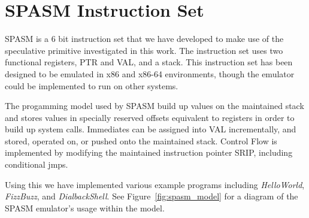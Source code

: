\pagebreak
\section{SPASM Instruction Set}
\label{appendix:spasm}
\renewcommand{\thefootnote}{\fnsymbol{footnote}}

SPASM is a 6 bit instruction set that we have developed to make use of the 
speculative primitive investigated in this work. The instruction set uses two 
functional registers, PTR and VAL, and a stack. This instruction set has been 
designed to be emulated in x86 and x86-64 environments, though the emulator 
could be implemented to run on other systems. 

The progamming model used by SPASM build up values on the maintained stack
and stores values in specially reserved offsets equivalent to registers 
in order to build up system calls. Immediates can be assigned into VAL
incrementally, and stored, operated on, or pushed onto the maintained
stack. Control Flow is implemented by modifying the maintained 
instruction pointer SRIP, including conditional jmps. 

Using this we have implemented various example programs including 
\textit{HelloWorld}, \textit{FizzBuzz}, and \textit{DialbackShell}.
See Figure~\ref{fig:spasm_model} for a diagram of the SPASM emulator's
usage within the \speculake model.


